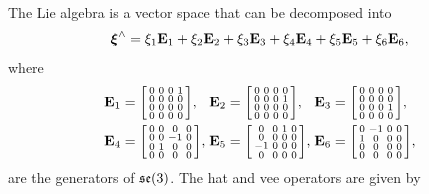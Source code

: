 The Lie algebra is a vector space that can be decomposed into
\begin{equation}
  {\boldsymbol{\mathbf{\xi}}}^\wedge = \xi_1 {\boldsymbol{\mathbf{E}}}_1 + \xi_2 {\boldsymbol{\mathbf{E}}}_2 + \xi_3 {\boldsymbol{\mathbf{E}}}_3 + \xi_4 {\boldsymbol{\mathbf{E}}}_4 + \xi_5 {\boldsymbol{\mathbf{E}}}_5 + \xi_6 {\boldsymbol{\mathbf{E}}}_6,
\end{equation}
where
\begin{equation}
\begin{alignedat}{3}
  &{\boldsymbol{\mathbf{E}}}_1 =
  \begin{bsmallmatrix}
    0 & 0 & 0 & 1\\
    0 & 0 & 0 & 0\\
    0 & 0 & 0 & 0\\
    0 & 0 & 0 & 0
  \end{bsmallmatrix}, \;
  &&{\boldsymbol{\mathbf{E}}}_2 =
  \begin{bsmallmatrix}
    0 & 0 & 0 & 0\\
    0 & 0 & 0 & 1\\
    0 & 0 & 0 & 0\\
    0 & 0 & 0 & 0
  \end{bsmallmatrix}, \;
  &&{\boldsymbol{\mathbf{E}}}_3 =
  \begin{bsmallmatrix}
    0 & 0 & 0 & 0\\
    0 & 0 & 0 & 0\\
    0 & 0 & 0 & 1\\
    0 & 0 & 0 & 0
  \end{bsmallmatrix},\\
  &{\boldsymbol{\mathbf{E}}}_4 =
  \begin{bsmallmatrix}
    0 & 0 & 0 & 0\\
    0 & 0 & -1 & 0\\
    0 & 1 & 0 & 0\\
    0 & 0 & 0 & 0
  \end{bsmallmatrix}, \;
  &&{\boldsymbol{\mathbf{E}}}_5 =
  \begin{bsmallmatrix}
    0 & 0 & 1 & 0\\
    0 & 0 & 0 & 0\\
    -1 & 0 & 0 & 0\\
    0 & 0 & 0 & 0
  \end{bsmallmatrix}, \;
  &&{\boldsymbol{\mathbf{E}}}_6 =
  \begin{bsmallmatrix}
    0 & -1 & 0 & 0\\
    1 & 0 & 0 & 0\\
    0 & 0 & 0 & 0\\
    0 & 0 & 0 & 0
  \end{bsmallmatrix},
\end{alignedat}
\end{equation}
are the generators of ${\mathfrak {se}}(3)$. The hat and vee operators are given by

